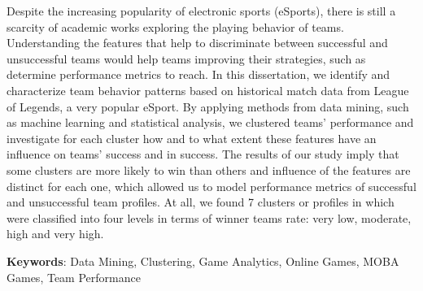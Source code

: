 Despite the increasing popularity of electronic sports (eSports), there is still a scarcity of academic works exploring the playing behavior of teams. Understanding the features that help to discriminate between successful and unsuccessful teams would help teams improving their strategies, such as determine performance metrics to reach. In this dissertation, we identify and characterize team behavior patterns based on historical match data from League of Legends, a very popular eSport. By applying methods from data mining, such as machine learning and statistical analysis, we clustered teams' performance and investigate for each cluster how and to what extent these features have an influence on teams'  success and in success. The results of our study imply that some clusters are more likely to win than others and influence of the features are distinct for each one, which allowed us to model performance metrics of successful and unsuccessful team profiles. At all, we found 7 clusters or profiles in which were classified into four levels in terms of winner teams rate: very low, moderate, high and very high.

\textbf{Keywords}: Data Mining, Clustering, Game Analytics, Online Games, MOBA Games, Team Performance